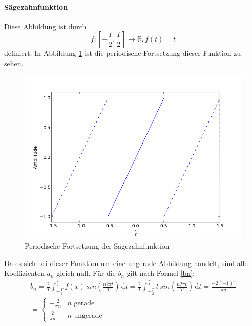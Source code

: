 \documentclass[11pt,ngerman,a4paper]{article}
\begin{document}
\paragraph{S\"agezahnfunktion} Diese Abbildung ist durch
\begin{equation}
f \colon  \left[-\frac{T}{2}, \frac{T}{2}\right]\to \mathbb{R}, f(t) = t
\end{equation}
definiert. In Abbildung \ref{org_saw} ist die periodische Fortsetzung dieser Funktion zu sehen.
\begin{figure}[htp]
\centering
\includegraphics[scale=0.7]{abb/Abb1.png}
\caption{Periodische Fortsetzung der S\"agezahnfunktion}
\label{org_saw}
\end{figure} Da es sich bei dieser Funktion um eine ungerade Abbildung handelt, sind alle Koeffizienten $a_n$ gleich null. F\"ur die $b_n$ gilt nach Formel \ref{bn}:
\begin{align}
b_n = \frac 2 T\int_{-\frac T 2}^\frac T 2\!f(x)\,sin\left(\frac{n2\pi t}{T}\right)\,\mathrm dt = \frac 2 T \int_{-\frac T 2}^\frac T 2\!t\,sin\left(\frac{n2\pi t}{T}\right)\,\mathrm dt =\frac{ -2(-1)^n}{\pi n}\\=
\begin{cases}
-\frac{2}{\pi n} & n \mbox{ gerade}  \\
\frac{2}{\pi n} & n \mbox{ ungerade}
\end{cases}
\end{align}
\end{document}
